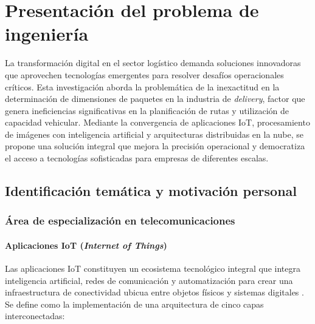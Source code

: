 
\chapter{Presentación del problema de ingeniería}

La transformación digital en el sector logístico demanda soluciones innovadoras que aprovechen tecnologías emergentes para resolver desafíos operacionales críticos. Esta investigación aborda la problemática de la inexactitud en la determinación de dimensiones de paquetes en la industria de \textit{delivery}, factor que genera ineficiencias significativas en la planificación de rutas y utilización de capacidad vehicular. Mediante la convergencia de aplicaciones IoT, procesamiento de imágenes con inteligencia artificial y arquitecturas distribuidas en la nube, se propone una solución integral que mejora la precisión operacional y democratiza el acceso a tecnologías sofisticadas para empresas de diferentes escalas.

\section{Identificación temática y motivación personal}

\subsection{Área de especialización en telecomunicaciones}

\subsubsection{Aplicaciones IoT (\textit{Internet of Things})}

Las aplicaciones IoT constituyen un ecosistema tecnológico integral que integra inteligencia artificial, redes de comunicación y automatización para crear una infraestructura de conectividad ubicua entre objetos físicos y sistemas digitales \cite{Liu2013}. Se define como la implementación de una arquitectura de cinco capas interconectadas:

